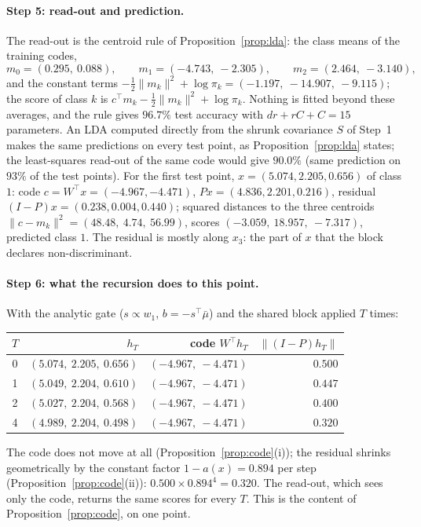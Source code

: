 \documentclass[11pt,a4paper]{article}
\theoremstyle{plain}
\theoremstyle{definition}
\theoremstyle{remark}
\newcommand{\T}{\top}
\begin{document}
\paragraph{Step 5: read-out and prediction.} The read-out is the
centroid rule of Proposition~\ref{prop:lda}: the class means of the
training codes,
\[
m_0=(0.295,\ 0.088),\qquad m_1=(-4.743,\ -2.305),\qquad m_2=(2.464,\ -3.140),
\]
and the constant terms $-\tfrac12\|m_k\|^2+\log\pi_k=(-1.197,\ -14.907,\ -9.115)$;
the score of class $k$ is $c^\T m_k-\tfrac12\|m_k\|^2+\log\pi_k$. Nothing is
fitted beyond these averages, and the rule gives $96.7\%$ test accuracy
with $dr+rC+C=15$ parameters. An LDA computed directly from the shrunk
covariance $S$ of Step~1 makes the same predictions on every test point,
as Proposition~\ref{prop:lda} states; the least-squares read-out of the same
code would give $90.0\%$ (same prediction on $93\%$ of the test points).
For the first test point, $x=(5.074,2.205,0.656)$ of class $1$: code
$c=W^\T x=(-4.967,-4.471)$, $Px=(4.836,2.201,0.216)$, residual
$(I-P)x=(0.238,0.004,0.440)$; squared distances to the three centroids
$\|c-m_k\|^2=(48.48,\ 4.74,\ 56.99)$, scores $(-3.059,\ 18.957,\ -7.317)$,
predicted class $1$. The residual is mostly along $x_3$: the part of $x$
that the block declares non-discriminant.

\paragraph{Step 6: what the recursion does to this point.} With the
analytic gate ($s\propto w_1$, $b=-s^\T\bar\mu$) and the shared block
applied $T$ times:
\begin{center}
\small
\begin{tabular}{crrr}
\toprule
$T$ & $h_T$ & code $W^\T h_T$ & $\|(I-P)h_T\|$ \\
\midrule
0 & $(5.074,\ 2.205,\ 0.656)$ & $(-4.967,\ -4.471)$ & $0.500$ \\
1 & $(5.049,\ 2.204,\ 0.610)$ & $(-4.967,\ -4.471)$ & $0.447$ \\
2 & $(5.027,\ 2.204,\ 0.568)$ & $(-4.967,\ -4.471)$ & $0.400$ \\
4 & $(4.989,\ 2.204,\ 0.498)$ & $(-4.967,\ -4.471)$ & $0.320$ \\
\bottomrule
\end{tabular}
\end{center}
The code does not move at all (Proposition~\ref{prop:code}(i)); the residual
shrinks geometrically by the constant factor $1-a(x)=0.894$ per step
(Proposition~\ref{prop:code}(ii)): $0.500\times0.894^4=0.320$. The read-out,
which sees only the code, returns the same scores for every $T$. This is
the content of Proposition~\ref{prop:code}, on one point.
\end{document}
